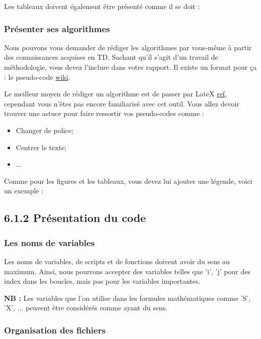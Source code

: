 \documentclass[11pt]{article}
\providecommand{\tightlist}{%
      \setlength{\itemsep}{0pt}\setlength{\parskip}{0pt}}
\begin{document}
Les tableaux doivent également être présenté comme il se doit :

    \subsubsection{Présenter ses
algorithmes}\label{pruxe9senter-ses-algorithmes}

Nous pouvons vous demander de rédiger les algorithmes par vous-même à
partir des connaissances acquises en TD. Sachant qu'il s'agit d'un
travail de méthodologie, vous devez l'inclure dans votre rapport. Il
existe un format pour ça : le pseudo-code
\href{https://en.wikipedia.org/wiki/Pseudocode}{wiki}.

Le meilleur moyen de rédiger un algorithme est de passer par LateX
\href{https://www.latex-project.org/}{ref}, cependant vous n'êtes pas
encore familiarisé avec cet outil. Vous allez devoir trouver une astuce
pour faire ressortir vos pseudo-codes comme :

\begin{itemize}
\tightlist
\item
  Changer de police;
\item
  Centrer le texte;
\item
  ...
\end{itemize}

Comme pour les figures et les tableaux, vous devez lui ajouter une
légende, voici un exemple :

    \subsection{6.1.2 Présentation du code}\label{pruxe9sentation-du-code}

\subsubsection{Les noms de variables}\label{les-noms-de-variables}

Les noms de variables, de scripts et de fonctions doivent avoir du sens
au maximum. Ainsi, nous pourrons accepter des variables telles que 'i',
'j' pour des index dans les boucles, mais pas pour les variables
importantes.

\textbf{NB :} Les variables que l'on utilise dans les formules
mathématiques comme 'S', 'X', ... peuvent être considérés comme ayant du
sens.

\subsubsection{Organisation des
fichiers}\label{organisation-des-fichiers}
\end{document}
